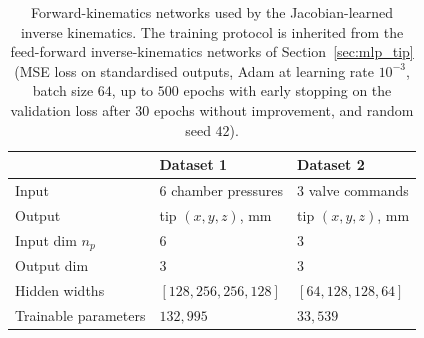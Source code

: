 \begin{table}[ht]
\centering
\caption[Forward-kinematics network configurations.]{Forward-kinematics networks used by the Jacobian-learned inverse kinematics. The training protocol is inherited from the feed-forward inverse-kinematics networks of Section~\ref{sec:mlp_tip} (MSE loss on standardised outputs, Adam at learning rate $10^{-3}$, batch size $64$, up to $500$ epochs with early stopping on the validation loss after $30$ epochs without improvement, and random seed $42$).}
\label{tab:fk_config}
\begin{tabularx}{\linewidth}{@{}l X X@{}}
\toprule
                      & Dataset 1                       & Dataset 2                     \\
\midrule
Input                 & 6 chamber pressures             & 3 valve commands              \\
Output                & tip $(x, y, z)$, mm             & tip $(x, y, z)$, mm           \\
Input dim $n_p$       & 6                               & 3                             \\
Output dim            & 3                               & 3                             \\
Hidden widths         & $[128, 256, 256, 128]$          & $[64, 128, 128, 64]$          \\
Trainable parameters  & $132{,}995$                     & $33{,}539$                    \\
\bottomrule
\end{tabularx}
\end{table}

